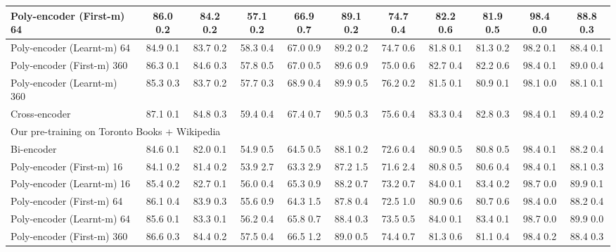 \documentclass{article} \usepackage{iclr2020_conference,times}
\begin{document}
\begin{table*}[h]
{\begin{tabular}{|l|c|c|c|c|c|c|c|c|c|c|}
Poly-encoder (First-m) 64 & 86.0  0.2 & 84.2  0.2 & 57.1  0.2 & 66.9  0.7 & 89.1  0.2 & 74.7  0.4 & 82.2  0.6 & 81.9  0.5 & 98.4  0.0 & 88.8  0.3\\ \hline 

Poly-encoder (Learnt-m) 64 & 84.9  0.1 & 83.7  0.2 & 58.3  0.4 & 67.0  0.9 & 89.2  0.2 & 74.7  0.6 & 81.8  0.1 & 81.3  0.2 & 98.2  0.1 & 88.4  0.1\\ \hline 

Poly-encoder (First-m) 360 & 86.3  0.1 & 84.6  0.3 & 57.8  0.5 & 67.0  0.5 & 89.6  0.9 & 75.0  0.6 & 82.7  0.4 & 82.2  0.6 & 98.4  0.1 & 89.0  0.4\\ \hline 

Poly-encoder (Learnt-m) 360 & 85.3  0.3 & 83.7  0.2 & 57.7  0.3 & 68.9  0.4 & 89.9  0.5 & 76.2  0.2 & 81.5  0.1 & 80.9  0.1 & 98.1  0.0 & 88.1  0.1\\ \hline 

Cross-encoder & 87.1  0.1& 84.8  0.3 & 59.4  0.4&   67.4  0.7& 90.5  0.3&  75.6  0.4 &  83.3  0.4& 82.8  0.3& 98.4  0.1& 89.4  0.2\\
\hline
\hline
 \multicolumn{11}{|l|}{Our pre-training on Toronto Books + Wikipedia}  \\
 \hline
Bi-encoder & 84.6  0.1 & 82.0  0.1 & 54.9  0.5 & 64.5  0.5 & 88.1  0.2 & 72.6  0.4 & 80.9  0.5 & 80.8  0.5 & 98.4  0.1 & 88.2  0.4\\ \hline 

Poly-encoder (First-m) 16 & 84.1  0.2 & 81.4  0.2 & 53.9  2.7 & 63.3  2.9 & 87.2  1.5 & 71.6  2.4 & 80.8  0.5 & 80.6  0.4 & 98.4  0.1 & 88.1  0.3\\ \hline 

Poly-encoder (Learnt-m) 16 & 85.4  0.2 & 82.7  0.1 & 56.0  0.4 & 65.3  0.9 & 88.2  0.7 & 73.2  0.7 & 84.0  0.1 & 83.4  0.2 & 98.7  0.0 & 89.9  0.1\\ \hline 

Poly-encoder (First-m) 64 & 86.1  0.4 & 83.9  0.3 & 55.6  0.9 & 64.3  1.5 & 87.8  0.4 & 72.5  1.0 & 80.9  0.6 & 80.7  0.6 & 98.4  0.0 & 88.2  0.4\\ \hline 

Poly-encoder (Learnt-m) 64 & 85.6  0.1 & 83.3  0.1 & 56.2  0.4 & 65.8  0.7 & 88.4  0.3 & 73.5  0.5 & 84.0  0.1 & 83.4  0.1 & 98.7  0.0 & 89.9  0.0\\ \hline 

Poly-encoder (First-m) 360 & 86.6  0.3 & 84.4  0.2 & 57.5  0.4 & 66.5  1.2 & 89.0  0.5 & 74.4  0.7 & 81.3  0.6 & 81.1  0.4 & 98.4  0.2 & 88.4  0.3\\ \hline 


\end{tabular}}
\end{table*}
\end{document}
